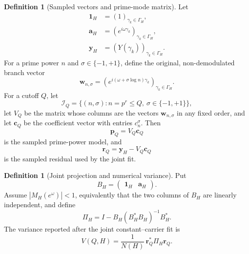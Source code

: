 \documentclass[11pt]{amsart}
\numberwithin{equation}{section}
\theoremstyle{plain}
\theoremstyle{definition}
\newtheorem{definition}[theorem]{Definition}
\theoremstyle{remark}
\newcommand{\1}{\mathbf{1}}
\begin{document}
\begin{definition}[Sampled vectors and prime-mode matrix]
\label{def:sampled_variance_vectors}
Let
\begin{align}
\mathbf 1_H
&=
(1)_{\gamma_k\in\Gamma_H},
\label{eq:sampled_one_vector}
\\
\mathbf a_H
&=
(e^{i\omega\gamma_k})_{\gamma_k\in\Gamma_H},
\label{eq:sampled_carrier_vector}
\\
\mathbf y_H
&=
(Y(\gamma_k))_{\gamma_k\in\Gamma_H}.
\label{eq:sampled_background_vector}
\end{align}
For a prime power $n$ and $\sigma\in\{-1,+1\}$, define the original,
non-demodulated branch vector
\begin{equation}
\mathbf w_{n,\sigma}
=
\left(e^{i(\omega+\sigma\log n)\gamma_k}\right)_{\gamma_k\in\Gamma_H}.
\label{eq:original_branch_vector}
\end{equation}
For a cutoff $Q$, let
\begin{equation}
\mathcal I_Q
=
\{(n,\sigma):n=p^r\leq Q,\ \sigma\in\{-1,+1\}\},
\label{eq:branch_index_set}
\end{equation}
let $V_Q$ be the matrix whose columns are the vectors
$\mathbf w_{n,\sigma}$ in any fixed order, and let $\mathbf c_Q$ be the
coefficient vector with entries $c_n^\sigma$.  Then
\begin{equation}
\mathbf p_Q=V_Q\mathbf c_Q
\label{eq:sampled_prime_model_vector}
\end{equation}
is the sampled prime-power model, and
\begin{equation}
\mathbf r_Q=\mathbf y_H-V_Q\mathbf c_Q
\label{eq:sampled_full_residual_vector}
\end{equation}
is the sampled residual used by the joint fit.
\end{definition}

\begin{definition}[Joint projection and numerical variance]
\label{def:joint_projection_variance}
Put
\begin{equation}
B_H=
\begin{pmatrix}
\mathbf 1_H&\mathbf a_H
\end{pmatrix}.
\label{eq:BH_definition}
\end{equation}
Assume $|M_H(e^\omega)|<1$, equivalently that the two columns of $B_H$
are linearly independent, and define
\begin{equation}
\Pi_H
=
I-B_H(B_H^\ast B_H)^{-1}B_H^\ast.
\label{eq:PiH_exact_definition}
\end{equation}
The variance reported after the joint constant--carrier fit is
\begin{equation}
\boxed{
V(Q,H)
=
\frac1{N(H)}\,\mathbf r_Q^\ast\Pi_H\mathbf r_Q.
}
\label{eq:numerical_variance_exact_definition}
\end{equation}
\end{definition}
\end{document}

